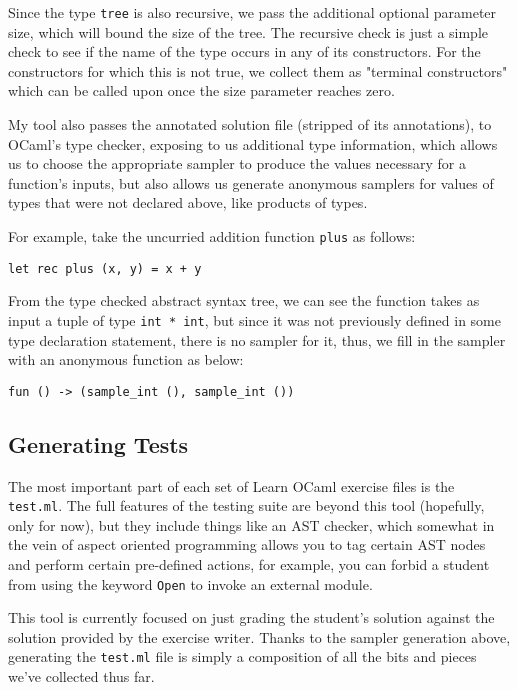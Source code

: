 \documentclass[11pt]{article}
\begin{document}
Since the type \verb+tree+ is also recursive, we pass the additional optional parameter size, which will bound the size of the tree. The recursive check is just a simple check to see if the name of the type occurs in any of its constructors. For the constructors for which this is not true, we collect them as "terminal constructors" which can be called upon once the size parameter reaches zero.

My tool also passes the annotated solution file (stripped of its annotations), to OCaml's type checker, exposing to us additional type information, which allows us to choose the appropriate sampler to produce the values necessary for a function's inputs, but also allows us generate anonymous samplers for values of types that were not declared above, like products of types.

For example, take the uncurried addition function \verb+plus+ as follows:
\begin{lstlisting}
let rec plus (x, y) = x + y
\end{lstlisting}

From the type checked abstract syntax tree, we can see the function takes as input a tuple of type \verb+int * int+, but since it was not previously defined in some type declaration statement, there is no sampler for it, thus, we fill in the sampler with an anonymous function as below:

\begin{lstlisting}
fun () -> (sample_int (), sample_int ())
\end{lstlisting}

\subsection{Generating Tests}
The most important part of each set of Learn OCaml exercise files is the \verb+test.ml+. The full features of the testing suite are beyond this tool (hopefully, only for now), but they include things like an AST checker, which somewhat in the vein of aspect oriented programming allows you to tag certain AST nodes and perform certain pre-defined actions, for example, you can forbid a student from using the keyword \verb+Open+ to invoke an external module.

This tool is currently focused on just grading the student's solution against the solution provided by the exercise writer. Thanks to the sampler generation above, generating the \verb+test.ml+ file is simply a composition of all the bits and pieces we've collected thus far.
\end{document}
